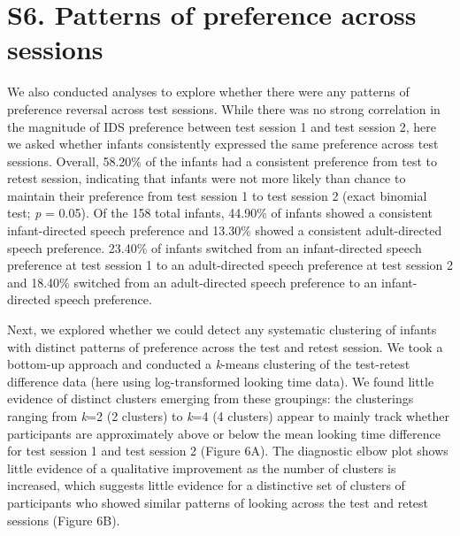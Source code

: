 \documentclass[
  man, donotrepeattitle,floatsintext]{apa6}
\begin{document}
\hypertarget{s6.-patterns-of-preference-across-sessions}{%
\section{S6. Patterns of preference across sessions}\label{s6.-patterns-of-preference-across-sessions}}

We also conducted analyses to explore whether there were any patterns of preference reversal across test sessions.
While there was no strong correlation in the magnitude of IDS preference between test session 1 and test session 2, here we asked whether infants consistently expressed the same preference across test sessions.
Overall, 58.20\% of the infants had a consistent preference from test to retest session, indicating that infants were not more likely than chance to maintain their preference from test session 1 to test session 2 (exact binomial test; \emph{p} =
0.05).
Of the 158 total infants, 44.90\% of infants showed a consistent infant-directed speech preference and 13.30\% showed a consistent adult-directed speech preference.
23.40\% of infants switched from an infant-directed speech preference at test session 1 to an adult-directed speech preference at test session 2 and 18.40\% switched from an adult-directed speech preference to an infant-directed speech preference.

Next, we explored whether we could detect any systematic clustering of infants with distinct patterns of preference across the test and retest session.
We took a bottom-up approach and conducted a \emph{k}-means clustering of the test-retest difference data (here using log-transformed looking time data).
We found little evidence of distinct clusters emerging from these groupings: the clusterings ranging from \emph{k}=2 (2 clusters) to \emph{k}=4 (4 clusters) appear to mainly track whether participants are approximately above or below the mean looking time difference for test session 1 and test session 2 (Figure 6A).
The diagnostic elbow plot shows little evidence of a qualitative improvement as the number of clusters is increased, which suggests little evidence for a distinctive set of clusters of participants who showed similar patterns of looking across the test and retest sessions (Figure 6B).
\end{document}
